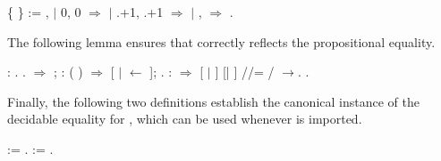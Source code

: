 \coqdoceol
\coqdocemptyline
\coqdocnoindent
{}    \{ \} :=\coqdoceol
\coqdocindent{1.00em}
 ,  \coqdoceol
\coqdocindent{1.00em}
\ensuremath{|} 0, 0 \ensuremath{\Rightarrow} \coqdoceol
\coqdocindent{1.00em}
\ensuremath{|} .+1, .+1 \ensuremath{\Rightarrow}   \coqdoceol
\coqdocindent{1.00em}
\ensuremath{|} \coqdocvar{\_}, \coqdocvar{\_} \ensuremath{\Rightarrow} \coqdoceol
\coqdocindent{1.00em}
.

\coqdocemptyline


\noindent
The following lemma ensures that  correctly reflects the
propositional equality.


\coqdoceol
\coqdocemptyline
\coqdocnoindent
{}  :  .\coqdoceol
\coqdocnoindent
{}.\coqdoceol
\coqdocnoindent
{}\ensuremath{\Rightarrow}  ; : ( ) \ensuremath{\Rightarrow} [ \ensuremath{|} \ensuremath{\leftarrow} ];    .\coqdoceol
\coqdocnoindent
{} :   \ensuremath{\Rightarrow} [ \ensuremath{|}  ] [|  ] //= / \ensuremath{\rightarrow}.\coqdoceol
\coqdocnoindent
{}.

\coqdocemptyline
\ssrtl{//=}


\noindent
Finally, the following two definitions establish the canonical instance
of the decidable equality for , which can be used whenever
 is imported.


\coqdoceol
\coqdocemptyline
\coqdocnoindent
{}  :=  .\coqdoceol
\coqdocnoindent
{}  :=   .

\coqdocemptyline


\begin{coqdoccode}
\coqdocemptyline
\end{coqdoccode}
